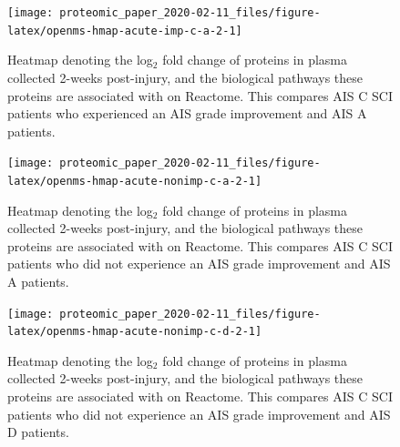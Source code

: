 \documentclass[9pt,lineno]{elife}
\begin{document}
\begin{landscape}



\begin{figure}

{\centering \texttt{[image: proteomic\_paper\_2020-02-11\_files/figure-latex/openms-hmap-acute-imp-c-a-2-1]} 

}

\caption[Heatmap - iTRAQ - Acute C Improvers VS Acute A]{Heatmap denoting the log\(_2\) fold change of proteins in plasma collected 2-weeks post-injury, and the biological pathways these proteins are associated with on Reactome. This compares AIS C SCI patients who experienced an AIS grade improvement and AIS A patients.}\label{fig:openms-hmap-acute-imp-c-a-2}
\end{figure}

\end{landscape}
\begin{landscape}



\begin{figure}

{\centering \texttt{[image: proteomic\_paper\_2020-02-11\_files/figure-latex/openms-hmap-acute-nonimp-c-a-2-1]} 

}

\caption[Heatmap - iTRAQ - Acute C Non-Improvers VS Acute A]{Heatmap denoting the log\(_2\) fold change of proteins in plasma collected 2-weeks post-injury, and the biological pathways these proteins are associated with on Reactome. This compares AIS C SCI patients who did not experience an AIS grade improvement and AIS A patients.}\label{fig:openms-hmap-acute-nonimp-c-a-2}
\end{figure}

\end{landscape}
\begin{landscape}



\begin{figure}

{\centering \texttt{[image: proteomic\_paper\_2020-02-11\_files/figure-latex/openms-hmap-acute-nonimp-c-d-2-1]} 

}

\caption[Heatmap - iTRAQ - Acute C Non-Improvers VS Acute D]{Heatmap denoting the log\(_2\) fold change of proteins in plasma collected 2-weeks post-injury, and the biological pathways these proteins are associated with on Reactome. This compares AIS C SCI patients who did not experience an AIS grade improvement and AIS D patients.}\label{fig:openms-hmap-acute-nonimp-c-d-2}
\end{figure}

\end{landscape}
\clearpage
\end{document}
